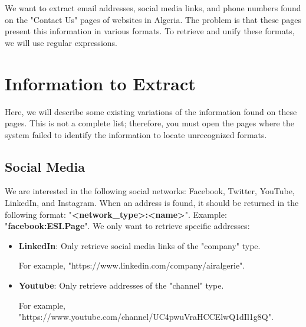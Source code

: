 \documentclass{../../../extra/aakpract/aakpract}
\begin{document}
\maketitle

\begin{center}
	\begin{minipage}{0.8\textwidth}
		\small
		We want to extract email addresses, social media links, and phone numbers found on the "Contact Us" pages of websites in Algeria.
		The problem is that these pages present this information in various formats.
		To retrieve and unify these formats, we will use regular expressions.
	\end{minipage}
\end{center}


\section{Information to Extract}

Here, we will describe some existing variations of the information found on these pages.
This is not a complete list; therefore, you must open the pages where the system failed to identify the information to locate unrecognized formats.

\subsection{Social Media}

We are interested in the following social networks: Facebook, Twitter, YouTube, LinkedIn, and Instagram.
When an address is found, it should be returned in the following format: "\textbf{\textless network\_type\textgreater:\textless name\textgreater}".
Example: "\textbf{facebook:ESI.Page}".
We only want to retrieve specific addresses:
\begin{itemize}
	\item \textbf{LinkedIn}: Only retrieve social media links of the "company" type.
	
	For example, "https://www.linkedin.com/company/airalgerie".
	
	\item \textbf{Youtube}: Only retrieve addresses of the "channel" type.
	
	For example, "https://www.youtube.com/channel/UC4pwuVraHCCElwQ1dIl1g8Q".
\end{itemize}
\end{document}
